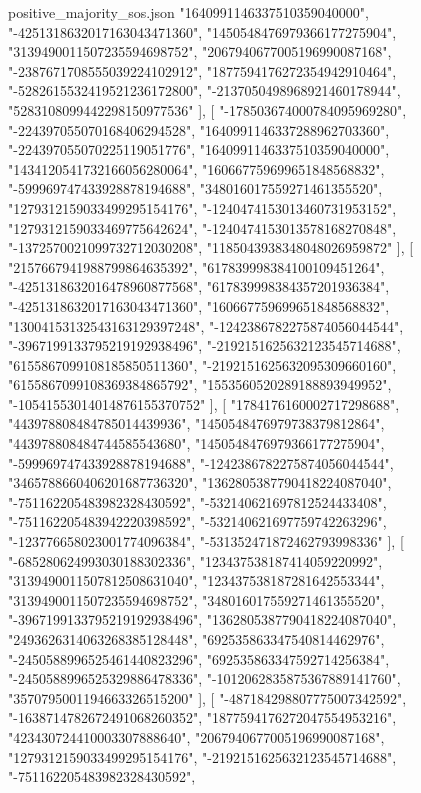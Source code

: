 \begin{filecontents*}[overwrite]{positive_majority_sos.json}
    "1640991146337510359040000",
    "-4251318632017163043471360",
    "1450548476979366177275904",
    "3139490011507235594698752",
    "2067940677005196990087168",
    "-2387671708555039224102912",
    "1877594176272354942910464",
    "-5282615532419521236172800",
    "-2137050498968921460178944",
    "5283108099442298150977536"
   ],
   [
    "-178503674000784095969280",
    "-224397055070168406294528",
    "1640991146337288962703360",
    "-224397055070225119051776",
    "1640991146337510359040000",
    "1434120541732166056280064",
    "160667759699651848568832",
    "-599969747433928878194688",
    "348016017559271461355520",
    "1279312159033499295154176",
    "-1240474153013460731953152",
    "1279312159033469775642624",
    "-1240474153013578168270848",
    "-1372570021099732712030208",
    "1185043938348048026959872"
   ],
   [
    "2157667941988799864635392",
    "617839998384100109451264",
    "-4251318632016478960877568",
    "617839998384357201936384",
    "-4251318632017163043471360",
    "160667759699651848568832",
    "13004153132543163129397248",
    "-1242386782275874056044544",
    "-3967199133795219192938496",
    "-2192151625632123545714688",
    "6155867099108185850511360",
    "-2192151625632095309660160",
    "6155867099108369384865792",
    "1553560520289188893949952",
    "-10541553014014876155370752"
   ],
   [
    "1784176160002717298688",
    "443978808484785014439936",
    "1450548476979738379812864",
    "443978808484744585543680",
    "1450548476979366177275904",
    "-599969747433928878194688",
    "-1242386782275874056044544",
    "3465788660406201687736320",
    "1362805387790418224087040",
    "-751162205483982328430592",
    "-532140621697812524433408",
    "-751162205483942220398592",
    "-532140621697759742263296",
    "-123776658023001774096384",
    "-531352471872462793998336"
   ],
   [
    "-685280624993030188302336",
    "123437538187414059220992",
    "3139490011507812508631040",
    "123437538187281642553344",
    "3139490011507235594698752",
    "348016017559271461355520",
    "-3967199133795219192938496",
    "1362805387790418224087040",
    "2493626314063268385128448",
    "692535863347540814462976",
    "-2450588996525461440823296",
    "692535863347592714256384",
    "-2450588996525329886478336",
    "-1012062835875367889141760",
    "3570795001194663326515200"
   ],
   [
    "-487184298807775007342592",
    "-1638714782672491068260352",
    "1877594176272047554953216",
    "423430724410003307888640",
    "2067940677005196990087168",
    "1279312159033499295154176",
    "-2192151625632123545714688",
    "-751162205483982328430592",

\end{filecontents*}
